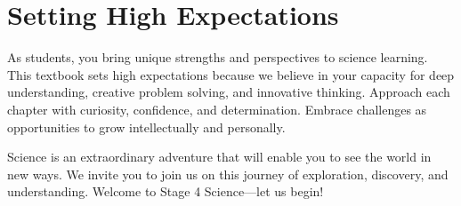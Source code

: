 \section{Setting High Expectations}

As students, you bring unique strengths and perspectives to science learning. This textbook sets high expectations because we believe in your capacity for deep understanding, creative problem solving, and innovative thinking. Approach each chapter with curiosity, confidence, and determination. Embrace challenges as opportunities to grow intellectually and personally.

Science is an extraordinary adventure that will enable you to see the world in new ways. We invite you to join us on this journey of exploration, discovery, and understanding. Welcome to Stage 4 Science—let us begin!

\FloatBarrier %
